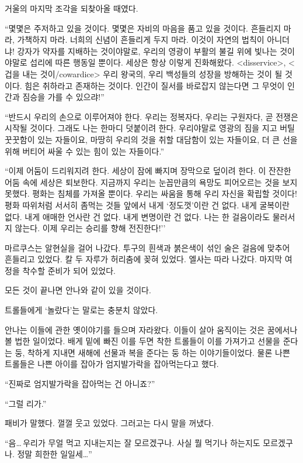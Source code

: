 거울의 마지막 조각을 되찾아올 때였다.

``몇몇은 주저하고 있을 것이다. 몇몇은 자비의 마음을 품고 있을 것이다. 흔들리지 마라, 가책하지 마라. 너희의 신념이 흔들리게 두지 마라. 이것이 자연의 법칙이 아니더냐! 강자가 약자를 지배하는 것이야말로, 우리의 영광이 부활의 불길 위에 빛나는 것이야말로 섭리에 따른 행동일 뿐이다. 세상은 항상 이렇게 진화해왔다. <disservice>, <겁을 내는 것이/cowardice> 우리 왕국의, 우리 백성들의 성장을 방해하는 것이 될 것이다. 힘은 취하라고 존재하는 것이다. 인간이 질서를 바로잡지 않는다면 그 무엇이 인간과 짐승을 가를 수 있으랴!''

``반드시 우리의 손으로 이루어져야 한다. 우리는 정복자다, 우리는 구원자다, 곧 전쟁은 시작될 것이다. 그래도 나는 한마디 덧붙이려 한다. 우리야말로 영광의 짐을 지고 버틸 꿋꿋함이 있는 자들이요, 마땅히 우리의 것을 취할 대담함이 있는 자들이요, 더 큰 선을 위해 버티어 싸울 수 있는 힘이 있는 자들이다.''

``이제 어둠이 드리워지려 한다. 세상이 잠에 빠지며 장막으로 덮이려 한다. 이 잔잔한 어둠 속에 세상은 퇴보한다. 지금까지 우리는 눈꼽만큼의 욕망도 피어오르는 것을 보지 못했다. 평화는 침체를 가져올 뿐이다. 우리는 싸움을 통해 우리 자신을 확립할 것이다! 평화 따위처럼 서서히 좀먹는 것들 앞에서 내게 `정도껏'이란 건 없다. 내게 굴복이란 없다. 내게 애매한 언사란 건 없다. 내게 변명이란 건 없다. 나는 한 걸음이라도 물러서지 않는다. 이제 우리는 승리를 향해 전진한다!''

마르쿠스는 알현실을 걸어 나갔다. 투구의 흰색과 붉은색이 섞인 술은 걸음에 맞추어 흔들리고 있었다. 칼 두 자루가 허리춤에 꽂혀 있었다. 엘사는 따라 나갔다. 마지막 여정을 착수할 준비가 되어 있었다.

모든 것이 끝나면 안나와 같이 있을 것이다.

\textbreak

트롤들에게 `놀랐다'는 말로는 충분치 않았다.

안나는 이들에 관한 옛이야기를 들으며 자라왔다. 이들이 살아 움직이는 것은 꿈에서나 볼 법한 일이었다. 배게 밑에 빠진 이를 두면 착한 트롤들이 이를 가져가고 선물을 준다는 둥, 착하게 지내면 새해에 선물과 복을 준다는 둥 하는 이야기들이었다. 물론 나쁜 트롤들은 나쁜 아이를 잡아가 엄지발가락을 잡아먹는다고 했다.

``진짜로 엄지발가락을 잡아먹는 건 아니죠?''

``그럴 리가.''

패비가 말했다. 껄껄 웃고 있었다. 그러고는 다시 말을 꺼냈다.

``음\ldots\,우리가 무얼 먹고 지내는지는 잘 모르겠구나. 사실 뭘 먹기나 하는지도 모르겠구나. 정말 희한한 일일세\ldots''

